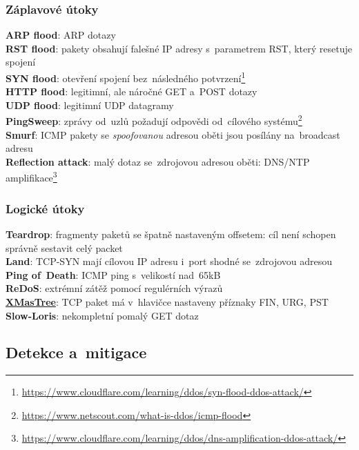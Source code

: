 \subsubsection{Záplavové útoky}

\textbf{ARP flood}: ARP dotazy \\
\textbf{RST flood}: pakety obsahují falešné IP adresy s~parametrem RST, který resetuje spojení \\
\textbf{SYN flood}: otevření spojení bez~následného potvrzení\footnote{\url{https://www.cloudflare.com/learning/ddos/syn-flood-ddos-attack/}} \\
\textbf{HTTP flood}: legitimní, ale náročné GET a~POST dotazy \\
\textbf{UDP flood}: legitimní UDP datagramy \\
\textbf{PingSweep}: zprávy od~uzlů požadují odpovědi od~cílového systému\footnote{\url{https://www.netscout.com/what-is-ddos/icmp-flood}} \\
\textbf{Smurf}: ICMP pakety se \emph{spoofovanou} adresou oběti jsou posílány na~broadcast adresu \\
\textbf{Reflection attack}: malý dotaz se~zdrojovou adresou oběti: DNS/NTP amplifikace\footnote{\url{https://www.cloudflare.com/learning/ddos/dns-amplification-ddos-attack/}}


\subsubsection{Logické útoky}

\textbf{Teardrop}: fragmenty paketů se špatně nastaveným offsetem: cíl není schopen správně sestavit celý packet \\
\textbf{Land}: TCP-SYN mají cílovou IP adresu i~port shodné se~zdrojovou adresou \\
\textbf{Ping of~Death}: ICMP ping s~velikostí nad~65kB \\
\textbf{ReDoS}: extrémní zátěž pomocí regulérních výrazů \\
\href{https://www.youtube.com/watch?v=XiFkyR35v2Y}{\textbf{XMasTree}}: TCP paket má v~hlavičce nastaveny příznaky FIN, URG, PST \\
\textbf{Slow-Loris}: nekompletní pomalý GET dotaz

\clearpage

\subsection{Detekce a~mitigace}

